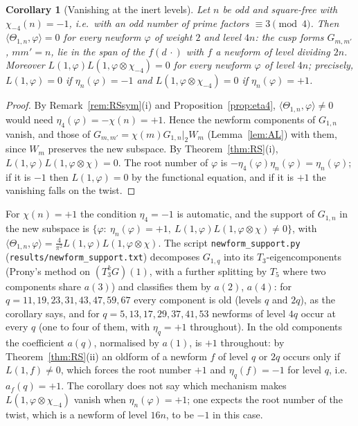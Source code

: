 ﻿\documentclass[11pt]{amsart}
\newtheorem{corollary}[theorem]{Corollary}
\theoremstyle{remark}
\begin{document}
\begin{corollary}[Vanishing at the inert levels]\label{cor:inert}
Let $n$ be odd and square-free with $\chi_{-4}(n)=-1$, i.e.\ with an odd number of prime factors $\equiv3\pmod4$. Then $\langle\Theta_{1,n},\varphi\rangle=0$ for every newform $\varphi$ of weight $2$ and level $4n$: the cusp forms $G_{m,m'}$, $mm'=n$, lie in the span of the $f(d\,\cdot)$ with $f$ a newform of level dividing $2n$. Moreover $L(1,\varphi)L(1,\varphi\otimes\chi_{-4})=0$ for every newform $\varphi$ of level $4n$; precisely, $L(1,\varphi)=0$ if $\eta_n(\varphi)=-1$ and $L(1,\varphi\otimes\chi_{-4})=0$ if $\eta_n(\varphi)=+1$.
\end{corollary}
\begin{proof}
By Remark~\ref{rem:RSsym}(i) and Proposition~\ref{prop:eta4}, $\langle\Theta_{1,n},\varphi\rangle\ne0$ would need $\eta_4(\varphi)=-\chi(n)=+1$. Hence the newform components of $G_{1,n}$ vanish, and those of $G_{m,m'}=\chi(m)G_{1,n}|_2W_m$ (Lemma~\ref{lem:AL}) with them, since $W_m$ preserves the new subspace. By Theorem~\ref{thm:RS}(i), $L(1,\varphi)L(1,\varphi\otimes\chi)=0$. The root number of $\varphi$ is $-\eta_4(\varphi)\eta_n(\varphi)=\eta_n(\varphi)$; if it is $-1$ then $L(1,\varphi)=0$ by the functional equation, and if it is $+1$ the vanishing falls on the twist.
\end{proof}

For $\chi(n)=+1$ the condition $\eta_4=-1$ is automatic, and the support of $G_{1,n}$ in the new subspace is $\{\varphi:\ \eta_n(\varphi)=+1,\ L(1,\varphi)L(1,\varphi\otimes\chi)\ne0\}$, with $\langle\Theta_{1,n},\varphi\rangle=\frac4{\pi^2}L(1,\varphi)L(1,\varphi\otimes\chi)$. The script \texttt{newform\_support.py} (\texttt{results/newform\_support.txt}) decomposes $G_{1,q}$ into its $T_3$-eigencomponents (Prony's method on $(T_3^kG)(1)$, with a further splitting by $T_5$ where two components share $a(3)$) and classifies them by $a(2)$, $a(4)$: for $q=11,19,23,31,43,47,59,67$ every component is old (levels $q$ and $2q$), as the corollary says, and for $q=5,13,17,29,37,41,53$ newforms of level $4q$ occur at every $q$ (one to four of them, with $\eta_q=+1$ throughout). In the old components the coefficient $a(q)$, normalised by $a(1)$, is $+1$ throughout: by Theorem~\ref{thm:RS}(ii) an oldform of a newform $f$ of level $q$ or $2q$ occurs only if $L(1,f)\ne0$, which forces the root number $+1$ and $\eta_q(f)=-1$ for level $q$, i.e.\ $a_f(q)=+1$. The corollary does not say which mechanism makes $L(1,\varphi\otimes\chi_{-4})$ vanish when $\eta_n(\varphi)=+1$; one expects the root number of the twist, which is a newform of level $16n$, to be $-1$ in this case.
\end{document}
